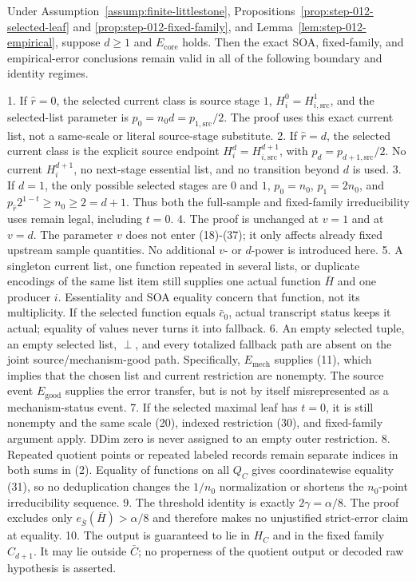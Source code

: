\begin{proposition}\label{prop:step-012-boundaries}
Under Assumption~\ref{assump:finite-littlestone},
Propositions~\ref{prop:step-012-selected-leaf} and
\ref{prop:step-012-fixed-family}, and
Lemma~\ref{lem:step-012-empirical}, suppose \(d\ge1\) and
\(E_{\mathrm{core}}\) holds. Then the exact SOA, fixed-family, and
empirical-error conclusions remain valid in all of the following boundary
and identity regimes.

1. If \(\widehat r=0\), the selected current class is source stage \(1\),
   \(H_i^0=H_{i,\mathrm{src}}^1\), and the selected-list parameter is
   \(p_0=n_0d=p_{1,\mathrm{src}}/2\). The proof uses this exact current
   list, not a same-scale or literal source-stage substitute.
2. If \(\widehat r=d\), the selected current class is the explicit source
   endpoint \(H_i^d=H_{i,\mathrm{src}}^{d+1}\), with
   \(p_d=p_{d+1,\mathrm{src}}/2\). No current \(H_i^{d+1}\), no next-stage
   essential list, and no transition beyond \(d\) is used.
3. If \(d=1\), the only possible selected stages are \(0\) and \(1\),
   \(p_0=n_0\), \(p_1=2n_0\), and
   \(p_{\widehat r}2^{1-t}\ge n_0\ge2=d+1\). Thus both the full-sample and
   fixed-family irreducibility uses remain legal, including \(t=0\).
4. The proof is unchanged at \(v=1\) and at \(v=d\). The parameter \(v\)
   does not enter (18)-(37); it only affects already fixed upstream sample
   quantities. No additional \(v\)- or \(d\)-power is introduced here.
5. A singleton current list, one function repeated in several lists, or
   duplicate encodings of the same list item still supplies one actual
   function \(\bar H\) and one producer \(i\). Essentiality and SOA
   equality concern that function, not its multiplicity. If the selected
   function equals \(\bar c_0\),  actual transcript status keeps it
   actual; equality of values never turns it into fallback.
6. An empty selected tuple, an empty selected list, \(\perp\), and every
   totalized fallback path are absent on the joint source/mechanism-good
   path. Specifically,  \(E_{\mathrm{mech}}\) supplies (11), which
   implies that the chosen list and current restriction are nonempty.
   The source event \(E_{\mathrm{good}}\) supplies the error transfer, but
   is not by itself misrepresented as a mechanism-status event.
7. If the selected maximal leaf has \(t=0\), it is still nonempty and the
   same scale (20), indexed restriction (30), and fixed-family argument
   apply. DDim zero is never assigned to an empty outer restriction.
8. Repeated quotient points or repeated labeled records remain separate
   indices in both sums in (2). Equality of functions on all \(Q_C\) gives
   coordinatewise equality (31), so no deduplication changes the
   \(1/n_0\) normalization or shortens the \(n_0\)-point irreducibility
   sequence.
9. The threshold identity is exactly
   \(2\gamma=\alpha/8\). The proof excludes only
   \(e_{\bar S}(\bar H)>\alpha/8\) and therefore makes no unjustified
   strict-error claim at equality.
10. The output is guaranteed to lie in \(H_C\) and in the fixed family
    \(\widehat C_{d+1}\). It may lie outside \(\bar C\); no properness of
    the quotient output or decoded raw hypothesis is asserted.



\end{proposition}

